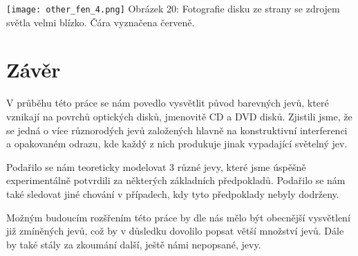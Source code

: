 \documentclass[titlepage]{article}
\begin{document}
 \label{image:20}
\begin{center}
    \texttt{[image: other\_fen\_4.png]}
    \linebreak
    Obrázek 20: Fotografie disku ze strany se zdrojem světla velmi blízko. Čára vyznačena červeně.
\end{center}

\section{Závěr}

V průběhu této práce se nám povedlo vysvětlit původ barevných jevů, které vznikají na povrchů optických disků, jmenovitě CD a DVD disků. Zjistili jsme, že se jedná o více různorodých jevů založených hlavně na konstruktivní interferenci a opakovaném odrazu, kde každý z nich produkuje jinak vypadající světelný jev.

Podařilo se nám teoreticky modelovat 3 různé jevy, které jsme úspěšně experimentálně potvrdili za některých základních předpokladů. Podařilo se nám také sledovat jiné chování v případech, kdy tyto předpoklady nebyly dodrženy.

Možným budoucím rozšřením této práce by dle nás mělo být obecnější vysvětlení již zmíněných jevů, což by v důsledku dovolilo popsat větší množství jevů. Dále by také stály za zkoumání další, ještě námi nepopsané, jevy.

\pagebreak
\end{document}
